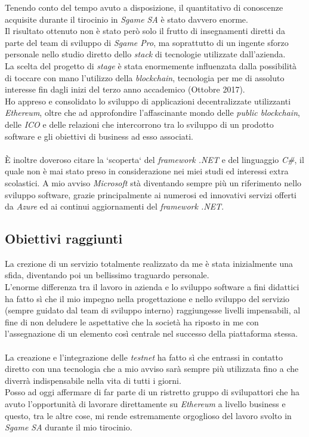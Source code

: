 \documentclass[11pt]{thesistemp}
\begin{document}
Tenendo conto del tempo avuto a disposizione, il quantitativo di conoscenze acquisite durante il tirocinio in \textit{Sgame SA} è stato davvero enorme.\\
Il risultato ottenuto non è stato però solo il frutto di insegnamenti diretti da parte del team di sviluppo di \textit{Sgame Pro}, ma soprattutto di un ingente sforzo personale nello studio diretto dello \textit{stack} di tecnologie utilizzate dall'azienda.\\
La scelta del progetto di \textit{stage} è stata enormemente influenzata dalla possibilità di toccare con mano l'utilizzo della \textit{blockchain}, tecnologia per me di assoluto interesse fin dagli inizi del terzo anno accademico (Ottobre 2017).\\
Ho appreso e consolidato lo sviluppo di applicazioni decentralizzate utilizzanti \textit{Ethereum}, oltre che ad approfondire l'affascinante mondo delle \textit{public blockchain}, delle \textit{ICO} e delle relazioni che intercorrono tra lo sviluppo di un prodotto software e gli obiettivi di business ad esso associati.\\\\
\`E inoltre doveroso citare la `scoperta` del \textit{framework .NET} e del linguaggio \textit{C\#}, il quale non è mai stato preso in considerazione nei miei studi ed interessi extra scolastici.
A mio avviso \textit{Microsoft} stà diventando sempre più un riferimento nello sviluppo software, grazie principalmente ai numerosi ed innovativi servizi offerti da \textit{Azure} ed ai continui aggiornamenti del \textit{framework .NET}.

\subsection{Obiettivi raggiunti}

La crezione di un servizio totalmente realizzato da me è stata inizialmente una sfida, diventando poi un bellissimo traguardo personale.\\
L'enorme differenza tra il lavoro in azienda e lo sviluppo software a fini didattici ha fatto sì che il mio impegno nella progettazione e nello sviluppo del servizio (sempre guidato dal team di sviluppo interno) raggiungesse livelli impensabili, al fine di non deludere le aspettative che la società ha riposto in me con l'assegnazione di un elemento così centrale nel successo della piattaforma stessa.\\\\
La creazione e l'integrazione delle \textit{testnet} ha fatto sì che entrassi in contatto diretto con una tecnologia che a mio avviso sarà sempre più utilizzata fino a che diverrà indispensabile nella vita di tutti i giorni.\\
Posso ad oggi affermare di far parte di un ristretto gruppo di svilupattori che ha avuto l'opportunità di lavorare direttamente su \textit{Ethereum} a livello business e questo, tra le altre cose, mi rende estremamente orgoglioso del lavoro svolto in \textit{Sgame SA} durante il mio tirocinio. 

\pagebreak


\end{document}
